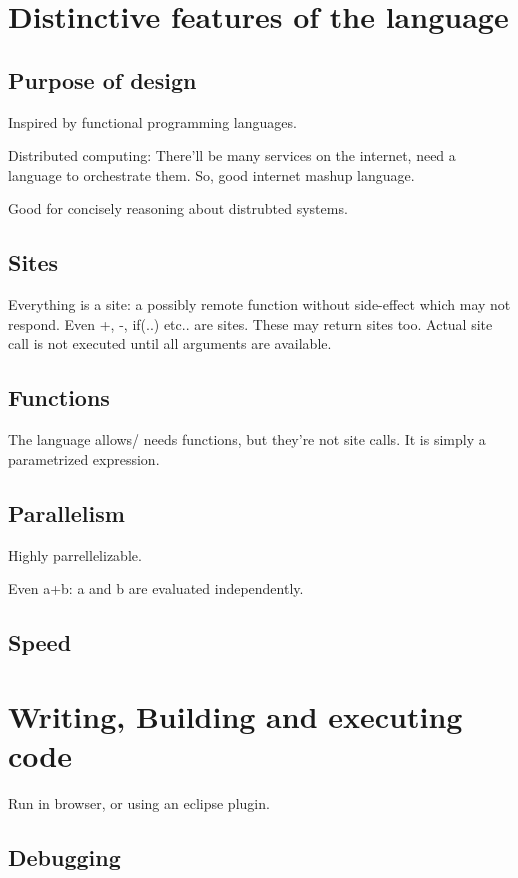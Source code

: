 \section{Distinctive features of the language}
\subsection{Purpose of design}
Inspired by functional programming languages.

Distributed computing: There'll be many services on the internet, need a language to orchestrate them. So, good internet mashup language.

Good for concisely reasoning about distrubted systems.

\subsection{Sites}
Everything is a site: a possibly remote function without side-effect which may not respond. Even +, -, if(..) etc.. are sites. These may return sites too. Actual site call is not executed until all arguments are available.

\subsection{Functions}
The language allows/ needs functions, but they're not site calls. It is simply a parametrized expression.

\subsection{Parallelism}
Highly parrellelizable.

Even a+b: a and b are evaluated independently.

\subsection{Speed}

\section{Writing, Building and executing code}
Run in browser, or using an eclipse plugin.

\subsection{Debugging}


